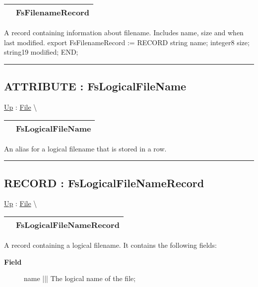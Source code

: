 {\renewcommand{\arraystretch}{1.5}
\begin{tabularx}{\textwidth}{|>{\raggedright\arraybackslash}l|X|}
\hline
\hspace{0pt} & FsFilenameRecord \\
\hline
\end{tabularx}
}

\par
A record containing information about filename. Includes name, size and when last modified. export FsFilenameRecord := RECORD string name; integer8 size; string19 modified; END;


\rule{\linewidth}{0.5pt}
\subsection*{ATTRIBUTE : FsLogicalFileName}
\hypertarget{ecldoc:file.fslogicalfilename}{}
\hyperlink{ecldoc:File}{Up} :
\hspace{0pt} \hyperlink{ecldoc:File}{File} \textbackslash 

{\renewcommand{\arraystretch}{1.5}
\begin{tabularx}{\textwidth}{|>{\raggedright\arraybackslash}l|X|}
\hline
\hspace{0pt} & FsLogicalFileName \\
\hline
\end{tabularx}
}

\par
An alias for a logical filename that is stored in a row.


\rule{\linewidth}{0.5pt}
\subsection*{RECORD : FsLogicalFileNameRecord}
\hypertarget{ecldoc:file.fslogicalfilenamerecord}{}
\hyperlink{ecldoc:File}{Up} :
\hspace{0pt} \hyperlink{ecldoc:File}{File} \textbackslash 

{\renewcommand{\arraystretch}{1.5}
\begin{tabularx}{\textwidth}{|>{\raggedright\arraybackslash}l|X|}
\hline
\hspace{0pt} & FsLogicalFileNameRecord \\
\hline
\end{tabularx}
}

\par
A record containing a logical filename. It contains the following fields:

\par
\begin{description}
\item [\textbf{Field}] name ||| The logical name of the file;
\end{description}

